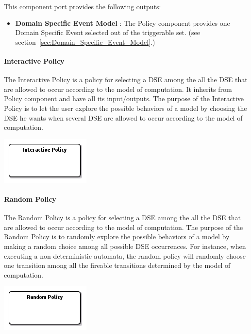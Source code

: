 \documentclass{gemoc} %
\begin{document}
This component port provides the following outputs:
\begin{itemize}
  \item \textbf{Domain Specific Event Model} :
The Policy component provides one Domain Specific Event selected out of the triggerable set.
(see section~\ref{sec:Domain_Specific_Event_Model}.)
\end{itemize}

\paragraph{Interactive Policy}
\label{sec:Interactive_Policy}
The Interactive Policy is a policy for selecting a DSE among the all the DSE that are allowed to occur according to the model of computation.
It inherits from Policy component and have all its input/outputs.
The purpose of the Interactive Policy is to let the user explore the possible behaviors of a model by choosing the DSE he wants when several DSE are allowed to occur according to the model of computation.
\begin{center}
\includegraphics*[trim=0.0cm 0.0cm 0cm 0.0cm, clip=true]{../images/generated/Generated_Interactive_Policy.png}
\end{center}




\paragraph{Random Policy}
\label{sec:Random_Policy}
The Random Policy is a policy for selecting a DSE among the all the DSE that are allowed to occur according to the model of computation.
The purpose of the Random Policy is to randomly explore the possible behaviors of a model by making a random choice among all possible DSE occurrences. For instance, when executing a non deterministic automata, the random policy will randomly choose one transition among all the fireable transitions determined by the model of computation.
\begin{center}
\includegraphics*[trim=0.0cm 0.0cm 0cm 0.0cm, clip=true]{../images/generated/Generated_Random_Policy.png}
\end{center}
\end{document}
